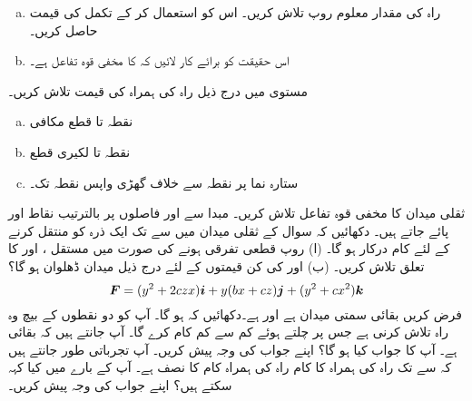 \begin{enumerate}[a.]
\item
راہ  کی مقدار معلوم روپ تلاش کریں۔ اس کو استعمال کر کے تکمل کی قیمت حاصل کریں۔
\item
اس حقیقت کو برائے کار لائیں کہ  کا مخفی قوہ تفاعل   ہے۔
\end{enumerate}
مستوی  میں درج ذیل راہ  کی ہمراہ  کی قیمت تلاش کریں۔
\begin{enumerate}[a.]
\item
نقطہ  تا  قطع مکافی 
\item
نقطہ  تا  لکیری قطع
\item
ستارہ نما  پر نقطہ  سے خلاف گھڑی واپس نقطہ  تک۔
\end{enumerate}
ثقلی میدان  کا مخفی قوہ تفاعل تلاش کریں۔
مبدا سے  اور  فاصلوں پر بالترتیب نقاط  اور  پائے جاتے ہیں۔ دکھائیں کہ سوال  کے ثقلی میدان میں  سے  تک ایک ذرہ کو منتقل کرنے کے لئے  کام درکار ہو گا۔
(ا) روپ  قطعی تفرقی ہونے کی صورت میں مستقل ،  اور    کا تعلق تلاش کریں۔ (ب)  اور  کی کن قیمتوں کے لئے درج ذیل  میدان ڈھلوان ہو گا؟
\[{{\boldsymbol{F}}}=(y^2+2czx){\boldsymbol{i}}+y(bx+cz){\boldsymbol{j}}+(y^2+cx^2){\boldsymbol{k}}\]
فرض کریں  بقائی سمتی میدان ہے اور  ہے۔دکھائیں کہ  ہو گا۔
آپ کو دو نقطوں کے بیچ وہ راہ تلاش کرنی ہے جس پر چلتے ہوئے  کم سے کم کام کرے گا۔ آپ جانتے ہیں کہ  بقائی ہے۔ آپ کا جواب کیا ہو گا؟ اپنے جواب کی وجہ پیش کریں۔
آپ تجرباتی طور جانتے ہیں کہ  سے  تک راہ  کی ہمراہ  کا کام راہ  کی ہمراہ کام کا نصف ہے۔ آپ  کے بارے میں کیا کہہ سکتے ہیں؟ اپنے جواب کی وجہ پیش کریں۔


